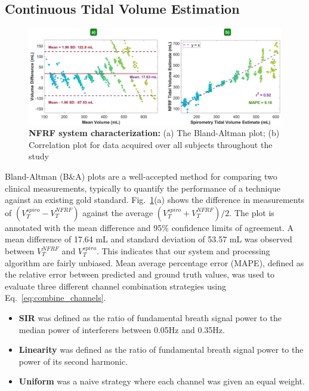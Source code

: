 \documentclass[journal]{IEEEtran}
\begin{document}
\subsection{Continuous Tidal Volume Estimation} \label{sec: tidal_vol_estimation}
\begin{figure}[t]
\centering
\includegraphics[width=.98\textwidth]{results_v3.jpg}
\caption{\textbf{NFRF system characterization:} (a) The Bland-Altman plot; (b) Correlation plot for data acquired over all subjects throughout the study}
\label{fig:results}
\end{figure}
Bland-Altman (B\&A) plots \cite{martinblandSTATISTICALMETHODSASSESSING1986}\cite{blandComparingMethodsMeasurement1995} are a well-accepted method for comparing two clinical measurements, typically to quantify the performance of a technique against an existing gold standard. Fig.~\ref{fig:results}(a) shows the difference in measurements of $(V^{spiro}_T - V^{NFRF}_T)$ against the average $(V^{spiro}_T + V^{NFRF}_T)/2$. The plot is annotated with the mean difference and 95\% confidence limits of agreement. A mean difference of 17.64 mL and standard deviation of 53.57 mL was observed between $V^{NFRF}_T$ and $V^{spiro}_T$. This indicates that our system and processing algorithm are fairly unbiased. Mean average percentage error (MAPE), defined as the relative error between predicted and ground truth values, was used to evaluate three different channel combination strategies using Eq.~\ref{eq:combine_channels}.
\begin{itemize}
    \item \textbf{SIR} was defined as the ratio of fundamental breath signal power to the median power of interferers between 0.05Hz and 0.35Hz. 
    \item \textbf{Linearity} was defined as the ratio of fundamental breath signal power to the power of its second harmonic. 
    \item \textbf{Uniform} was a naive strategy where each channel was given an equal weight.
\end{itemize}
\end{document}
